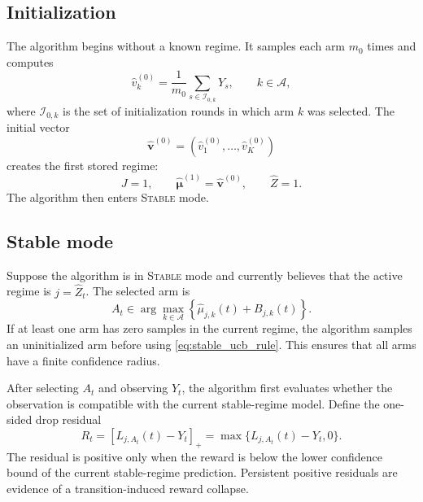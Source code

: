 \documentclass[11pt]{article}
\newcommand{\A}{\mathcal A}
\newcommand{\pos}[1]{\left[#1\right]_{+}}
\begin{document}
\subsection{Initialization}
\label{subsec:initialization}

The algorithm begins without a known regime. It samples each arm $m_0$ times and computes
\begin{equation}
\label{eq:initial_mean_vector}
\widehat v_k^{(0)}
=
\frac{1}{m_0}
\sum_{s\in\mathcal I_{0,k}}Y_s,
\qquad
k\in\A,
\end{equation}
where $\mathcal I_{0,k}$ is the set of initialization rounds in which arm $k$ was selected. The initial vector
\begin{equation}
\label{eq:initial_vector}
\widehat{\bm v}^{(0)}
=
(\widehat v_1^{(0)},\ldots,\widehat v_K^{(0)})
\end{equation}
creates the first stored regime:
\begin{equation}
\label{eq:first_regime}
J=1,
\qquad
\widehat{\bm\mu}^{(1)}=\widehat{\bm v}^{(0)},
\qquad
\widehat Z=1.
\end{equation}
The algorithm then enters \textsc{Stable} mode.

\subsection{Stable mode}
\label{subsec:stable_mode}

Suppose the algorithm is in \textsc{Stable} mode and currently believes that the active regime is $j=\widehat Z_t$. The selected arm is
\begin{equation}
\label{eq:stable_ucb_rule}
A_t
\in
\arg\max_{k\in\A}
\left\{
\widehat\mu_{j,k}(t)+B_{j,k}(t)
\right\}.
\end{equation}
If at least one arm has zero samples in the current regime, the algorithm samples an uninitialized arm before using \eqref{eq:stable_ucb_rule}. This ensures that all arms have a finite confidence radius.

After selecting $A_t$ and observing $Y_t$, the algorithm first evaluates whether the observation is compatible with the current stable-regime model. Define the one-sided drop residual
\begin{equation}
\label{eq:drop_residual}
R_t
=
\pos{L_{j,A_t}(t)-Y_t}
=
\max\{L_{j,A_t}(t)-Y_t,0\}.
\end{equation}
The residual is positive only when the reward is below the lower confidence bound of the current stable-regime prediction. Persistent positive residuals are evidence of a transition-induced reward collapse.
\end{document}
